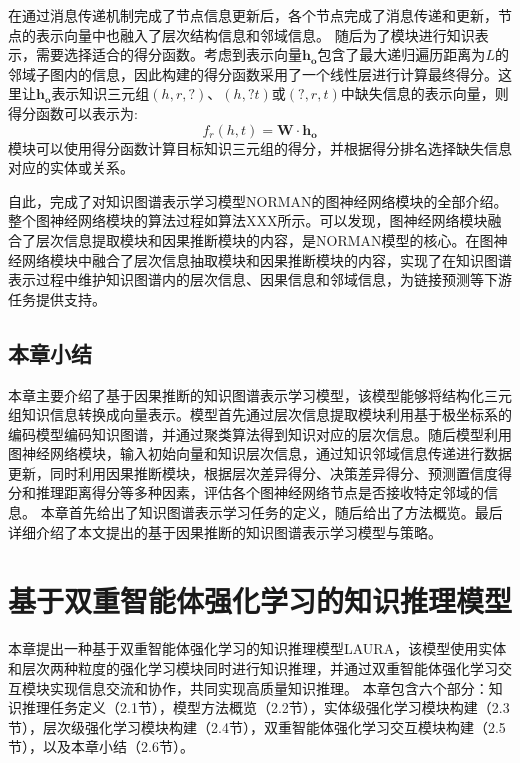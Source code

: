 \documentclass[algorithmlist, AutoFakeBold, AutoFakeSlant, figurelist, tablelist, nomlist, masters]{seuthesix}
\begin{document}
在通过消息传递机制完成了节点信息更新后，各个节点完成了消息传递和更新，节点的表示向量中也融入了层次结构信息和邻域信息。
随后为了模块进行知识表示，需要选择适合的得分函数。考虑到表示向量$\bm{h_o}$包含了最大递归遍历距离为$L$的邻域子图内的信息，因此构建的得分函数采用了一个线性层进行计算最终得分。这里让$\bm{h_o}$表示知识三元组$(h, r, ?)$、$(h, ? t)$或$(?, r, t)$中缺失信息的表示向量，则得分函数可以表示为:
\begin{equation}
  f_{r}(h, t) = \mathbf{W} \cdot \bm{h_o}
  \label{equation_GNNScore}
\end{equation}
模块可以使用得分函数计算目标知识三元组的得分，并根据得分排名选择缺失信息对应的实体或关系。


自此，完成了对知识图谱表示学习模型NORMAN的图神经网络模块的全部介绍。整个图神经网络模块的算法过程如算法XXX所示。可以发现，图神经网络模块融合了层次信息提取模块和因果推断模块的内容，是NORMAN模型的核心。在图神经网络模块中融合了层次信息抽取模块和因果推断模块的内容，实现了在知识图谱表示过程中维护知识图谱内的层次信息、因果信息和邻域信息，为链接预测等下游任务提供支持。


\section{本章小结}
本章主要介绍了基于因果推断的知识图谱表示学习模型，该模型能够将结构化三元组知识信息转换成向量表示。模型首先通过层次信息提取模块利用基于极坐标系的编码模型编码知识图谱，并通过聚类算法得到知识对应的层次信息。随后模型利用图神经网络模块，输入初始向量和知识层次信息，通过知识邻域信息传递进行数据更新，同时利用因果推断模块，根据层次差异得分、决策差异得分、预测置信度得分和推理距离得分等多种因素，评估各个图神经网络节点是否接收特定邻域的信息。
本章首先给出了知识图谱表示学习任务的定义，随后给出了方法概览。最后详细介绍了本文提出的基于因果推断的知识图谱表示学习模型与策略。


\chapter{基于双重智能体强化学习的知识推理模型}
本章提出一种基于双重智能体强化学习的知识推理模型LAURA，该模型使用实体和层次两种粒度的强化学习模块同时进行知识推理，并通过双重智能体强化学习交互模块实现信息交流和协作，共同实现高质量知识推理。
本章包含六个部分：知识推理任务定义（2.1节），模型方法概览（2.2节），实体级强化学习模块构建（2.3节），层次级强化学习模块构建（2.4节），双重智能体强化学习交互模块构建（2.5节），以及本章小结（2.6节）。
\end{document}
